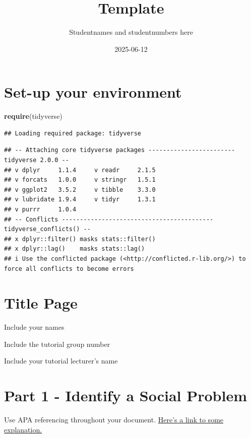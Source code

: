 \documentclass[
]{article}
\title{Template}
\author{Studentnames and studentnumbers here}
\date{2025-06-12}
\newenvironment{Shaded}{\begin{snugshade}}{\end{snugshade}}
\newcommand{\FunctionTok}[1]{\textcolor[rgb]{0.13,0.29,0.53}{\textbf{#1}}}
\newcommand{\NormalTok}[1]{#1}
\begin{document}
\maketitle

\section{Set-up your environment}\label{set-up-your-environment}

\begin{Shaded}
\begin{Highlighting}[]
\FunctionTok{require}\NormalTok{(tidyverse)}
\end{Highlighting}
\end{Shaded}

\begin{verbatim}
## Loading required package: tidyverse
\end{verbatim}

\begin{verbatim}
## -- Attaching core tidyverse packages ------------------------ tidyverse 2.0.0 --
## v dplyr     1.1.4     v readr     2.1.5
## v forcats   1.0.0     v stringr   1.5.1
## v ggplot2   3.5.2     v tibble    3.3.0
## v lubridate 1.9.4     v tidyr     1.3.1
## v purrr     1.0.4     
## -- Conflicts ------------------------------------------ tidyverse_conflicts() --
## x dplyr::filter() masks stats::filter()
## x dplyr::lag()    masks stats::lag()
## i Use the conflicted package (<http://conflicted.r-lib.org/>) to force all conflicts to become errors
\end{verbatim}

\section{Title Page}\label{title-page}

Include your names

Include the tutorial group number

Include your tutorial lecturer's name

\section{Part 1 - Identify a Social
Problem}\label{part-1---identify-a-social-problem}

Use APA referencing throughout your document.
\href{https://www.mendeley.com/guides/apa-citation-guide/}{Here's a link
to some explanation.}
\end{document}
